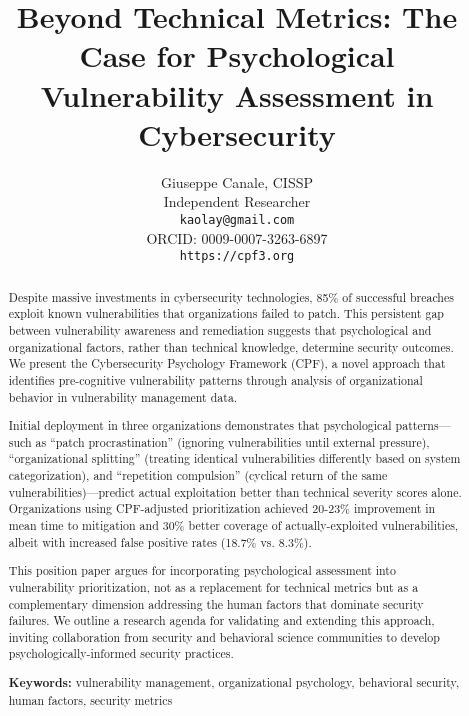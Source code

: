 \documentclass[11pt,a4paper]{article}
\begin{document}
\title{\Large \textbf{Beyond Technical Metrics: The Case for Psychological\\Vulnerability Assessment in Cybersecurity}}

\author{
Giuseppe Canale, CISSP\\
Independent Researcher\\
\texttt{kaolay@gmail.com}\\
ORCID: 0009-0007-3263-6897\\
\texttt{https://cpf3.org}
}

\date{}

\maketitle

\begin{abstract}
\noindent
Despite massive investments in cybersecurity technologies, 85\% of successful breaches exploit known vulnerabilities that organizations failed to patch. This persistent gap between vulnerability awareness and remediation suggests that psychological and organizational factors, rather than technical knowledge, determine security outcomes. We present the Cybersecurity Psychology Framework (CPF), a novel approach that identifies pre-cognitive vulnerability patterns through analysis of organizational behavior in vulnerability management data. 

Initial deployment in three organizations demonstrates that psychological patterns—such as ``patch procrastination'' (ignoring vulnerabilities until external pressure), ``organizational splitting'' (treating identical vulnerabilities differently based on system categorization), and ``repetition compulsion'' (cyclical return of the same vulnerabilities)—predict actual exploitation better than technical severity scores alone. Organizations using CPF-adjusted prioritization achieved 20-23\% improvement in mean time to mitigation and 30\% better coverage of actually-exploited vulnerabilities, albeit with increased false positive rates (18.7\% vs. 8.3\%).

This position paper argues for incorporating psychological assessment into vulnerability prioritization, not as a replacement for technical metrics but as a complementary dimension addressing the human factors that dominate security failures. We outline a research agenda for validating and extending this approach, inviting collaboration from security and behavioral science communities to develop psychologically-informed security practices.

\vspace{0.5em}
\noindent\textbf{Keywords:} vulnerability management, organizational psychology, behavioral security, human factors, security metrics
\end{abstract}
\end{document}
